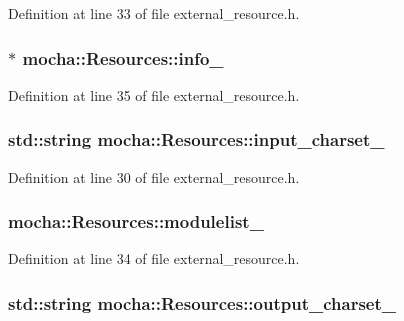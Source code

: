 Definition at line 33 of file external\_\-resource.h.

\hypertarget{classmocha_1_1_resources_ab4cadf1432623cb6965096a467d5c88d}{
\subsubsection[{info\_\-}]{$\ast$ {\bf mocha::Resources::info\_\-}}}
\label{classmocha_1_1_resources_ab4cadf1432623cb6965096a467d5c88d}


Definition at line 35 of file external\_\-resource.h.

\hypertarget{classmocha_1_1_resources_aed6e763a953593244d82f1d8719cdd42}{
\subsubsection[{input\_\-charset\_\-}]{\setlength{\rightskip}{0pt plus 5cm}std::string {\bf mocha::Resources::input\_\-charset\_\-}}}
\label{classmocha_1_1_resources_aed6e763a953593244d82f1d8719cdd42}


Definition at line 30 of file external\_\-resource.h.

\hypertarget{classmocha_1_1_resources_af41a0c56b5d657ad8d98e0a70a030038}{
\subsubsection[{modulelist\_\-}]{ {\bf mocha::Resources::modulelist\_\-}}}
\label{classmocha_1_1_resources_af41a0c56b5d657ad8d98e0a70a030038}


Definition at line 34 of file external\_\-resource.h.

\hypertarget{classmocha_1_1_resources_ab885bf85cea539a88e3470d641a2bbfb}{
\subsubsection[{output\_\-charset\_\-}]{\setlength{\rightskip}{0pt plus 5cm}std::string {\bf mocha::Resources::output\_\-charset\_\-}}}
\label{classmocha_1_1_resources_ab885bf85cea539a88e3470d641a2bbfb}


